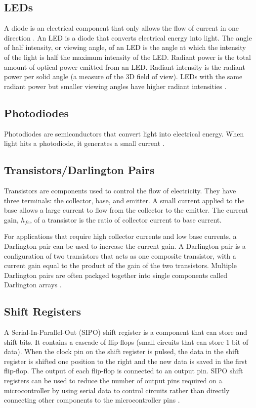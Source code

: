\documentclass[ oneside,%
                    author={Jack Jarvis},
                    degree={BSc},
                     title={FlexIR: Flexible PCB Wristbands for Infrared Based Gesture Recognition},
                    unit={COMS30045},
                    subtitle={Investigating the Effect of LED Viewing Angle on Gesture Classification in Infrared Sensing Systems}]{dissertation}
\begin{document}
\subsection{LEDs}
A diode is an electrical component that only allows the flow of current in one direction \cite{Horowitz2015TheEdition}. An LED is a diode that converts electrical energy into light. The angle of half intensity, or viewing angle, of an LED is the angle at which the intensity of the light is half the maximum intensity of the LED. Radiant power is the total amount of optical power emitted from an LED. Radiant intensity is the radiant power per solid angle (a measure of the 3D field of view). LEDs with the same radiant power but smaller viewing angles have higher radiant intensities \cite{Schubert2006Light-EmittingDiodes}.

\subsection{Photodiodes}
Photodiodes are semiconductors that convert light into electrical energy. When light hits a photodiode, it generates a small current \cite{Horowitz2015TheEdition}.
\subsection{Transistors/Darlington Pairs}
Transistors are components used to control the flow of electricity. They have three terminals: the collector, base, and emitter. A small current applied to the base allows a large current to flow from the collector to the emitter. The current gain, \(h_{fe}\), of a transistor is the ratio of collector current to base current.

For applications that require high collector currents and low base currents, a Darlington pair can be used to increase the current gain. A Darlington pair is a configuration of two transistors that acts as one composite transistor, with a current gain equal to the product of the gain of the two transistors. Multiple Darlington pairs are often packged together into single components called Darlington arrays \cite{Horowitz2015TheEdition}.
\subsection{Shift Registers}
A Serial-In-Parallel-Out (SIPO) shift register is a component that can store and shift bits. It contains a cascade of flip-flops (small circuits that can store 1 bit of data). When the clock pin on the shift register is pulsed, the data in the shift register is shifted one position to the right and the new data is saved in the first flip-flop. The output of each flip-flop is connected to an output pin. SIPO shift registers can be used to reduce the number of output pins required on a microcontroller by using serial data to control circuits rather than directly connecting other components to the microcontroller pins \cite{Holdsworth2007DigitalDesign}.
\end{document}

